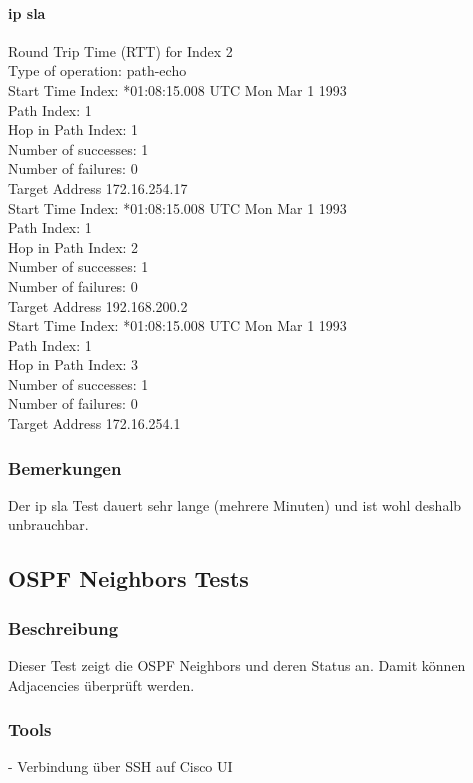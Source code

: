 \documentclass[a4,12pt]{scrartcl}
\begin{document}
\paragraph{ip sla}\hfill

\noindent Round Trip Time (RTT) for       Index 2\\
Type of operation: path-echo\\
Start Time Index: *01:08:15.008 UTC Mon Mar 1 1993\\
Path Index: 1\\
Hop in Path Index: 1\\
Number of successes: 1\\
Number of failures: 0\\
Target Address 172.16.254.17\\

\noindent Start Time Index: *01:08:15.008 UTC Mon Mar 1 1993\\
Path Index: 1\\
Hop in Path Index: 2\\
Number of successes: 1\\
Number of failures: 0\\
Target Address 192.168.200.2\\

\noindent Start Time Index: *01:08:15.008 UTC Mon Mar 1 1993\\
Path Index: 1\\
Hop in Path Index: 3\\
Number of successes: 1\\
Number of failures: 0\\
Target Address 172.16.254.1
\subsubsection{Bemerkungen}
Der ip sla Test dauert sehr lange (mehrere Minuten) und ist wohl deshalb unbrauchbar.

\subsection{OSPF Neighbors Tests}
\subsubsection{Beschreibung}
Dieser Test zeigt die OSPF Neighbors und deren Status an. Damit können Adjacencies überprüft werden.
\subsubsection{Tools}
- Verbindung über SSH auf Cisco UI
\end{document}
